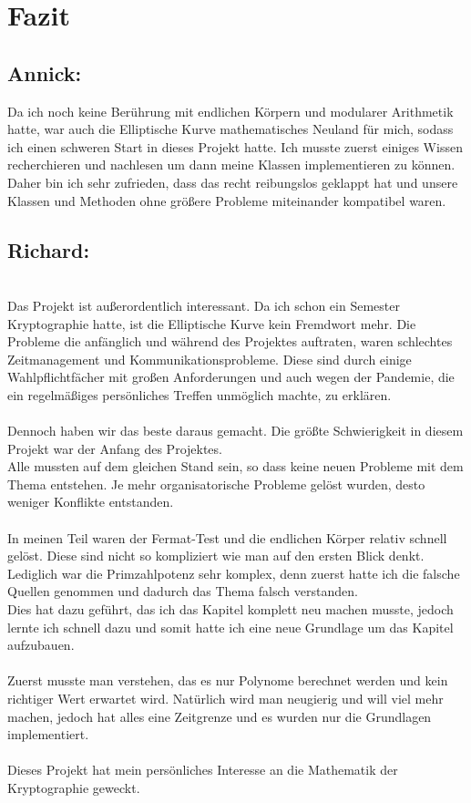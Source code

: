 \chapter{Fazit}

\section*{Annick:}
Da ich noch keine Berührung mit endlichen Körpern und modularer Arithmetik hatte, war auch die Elliptische Kurve mathematisches Neuland für mich, sodass ich einen schweren Start in dieses Projekt hatte. Ich musste zuerst einiges Wissen recherchieren und nachlesen um dann meine Klassen implementieren zu können. Daher bin ich sehr zufrieden, dass das recht reibungslos geklappt hat und unsere Klassen und Methoden ohne größere Probleme miteinander kompatibel waren. 


\section*{Richard:}
\\
Das Projekt ist außerordentlich interessant. Da ich schon ein Semester Kryptographie hatte, 
ist die Elliptische Kurve kein Fremdwort mehr. Die Probleme die anfänglich und während des Projektes auftraten, waren schlechtes Zeitmanagement und Kommunikationsprobleme.
Diese sind durch einige Wahlpflichtfächer mit großen Anforderungen und auch wegen der Pandemie, die ein regelmäßiges persönliches Treffen unmöglich machte, zu erklären.\\
\\
Dennoch haben wir das beste daraus gemacht. Die größte Schwierigkeit in diesem Projekt war der Anfang des Projektes.
\\
Alle mussten auf dem gleichen Stand sein, so dass keine neuen Probleme mit dem Thema entstehen.
Je mehr organisatorische Probleme gelöst wurden, desto weniger Konflikte entstanden.
\\
\\
In meinen Teil waren der Fermat-Test und die endlichen Körper relativ schnell gelöst.
Diese sind nicht so kompliziert wie man auf den ersten Blick denkt.\\
Lediglich war die Primzahlpotenz sehr komplex, denn zuerst hatte ich die falsche Quellen genommen und dadurch das Thema falsch verstanden.\\
Dies hat dazu geführt, das ich das Kapitel komplett neu machen musste, jedoch lernte ich schnell dazu und somit hatte ich eine neue Grundlage um das Kapitel aufzubauen.\\
\\
Zuerst musste man verstehen, das es nur Polynome berechnet werden und kein richtiger Wert erwartet wird. 
Natürlich wird man neugierig und will viel mehr machen, jedoch hat alles eine Zeitgrenze und es wurden nur die Grundlagen implementiert.\\
\\
Dieses Projekt hat mein persönliches Interesse an die Mathematik der Kryptographie geweckt. 

